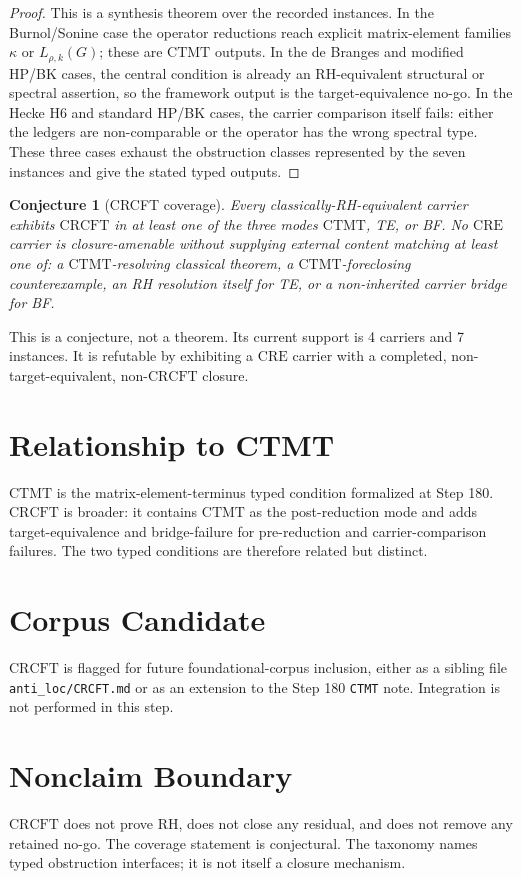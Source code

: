 \documentclass[11pt]{article}
\newtheorem{conjecture}{Conjecture}
\newcommand{\CRCFT}{\mathrm{CRCFT}}
\newcommand{\CTMT}{\mathrm{CTMT}}
\newcommand{\CRE}{\mathrm{CRE}}
\begin{document}
\begin{proof}
This is a synthesis theorem over the recorded instances.  In the Burnol/Sonine
case the operator reductions reach explicit matrix-element families
\(\kappa\) or \(L_{\rho,k}(G)\); these are \(\CTMT\) outputs.  In the
de Branges and modified HP/BK cases, the central condition is already an
RH-equivalent structural or spectral assertion, so the framework output is the
target-equivalence no-go.  In the Hecke H6 and standard HP/BK cases, the
carrier comparison itself fails: either the ledgers are non-comparable or the
operator has the wrong spectral type.  These three cases exhaust the
obstruction classes represented by the seven instances and give the stated
typed outputs.
\end{proof}

\begin{conjecture}[CRCFT coverage]
Every classically-RH-equivalent carrier exhibits \(\CRCFT\) in at least one of
the three modes \(\CTMT\), TE, or BF.  No \(\CRE\) carrier is
closure-amenable without supplying external content matching at least one of:
a \(\CTMT\)-resolving classical theorem, a \(\CTMT\)-foreclosing
counterexample, an RH resolution itself for TE, or a non-inherited carrier
bridge for BF.
\end{conjecture}

This is a conjecture, not a theorem.  Its current support is 4 carriers and 7
instances.  It is refutable by exhibiting a \(\CRE\) carrier with a completed,
non-target-equivalent, non-\(\CRCFT\) closure.

\section*{Relationship to CTMT}

\(\CTMT\) is the matrix-element-terminus typed condition formalized at Step
180.  \(\CRCFT\) is broader: it contains \(\CTMT\) as the post-reduction mode
and adds target-equivalence and bridge-failure for pre-reduction and
carrier-comparison failures.  The two typed conditions are therefore related
but distinct.

\section*{Corpus Candidate}

\(\CRCFT\) is flagged for future foundational-corpus inclusion, either as a
sibling file \texttt{anti\_loc/CRCFT.md} or as an extension to the Step 180
\texttt{CTMT} note.  Integration is not performed in this step.

\section*{Nonclaim Boundary}

\(\CRCFT\) does not prove RH, does not close any residual, and does not remove
any retained no-go.  The coverage statement is conjectural.  The taxonomy
names typed obstruction interfaces; it is not itself a closure mechanism.
\end{document}
